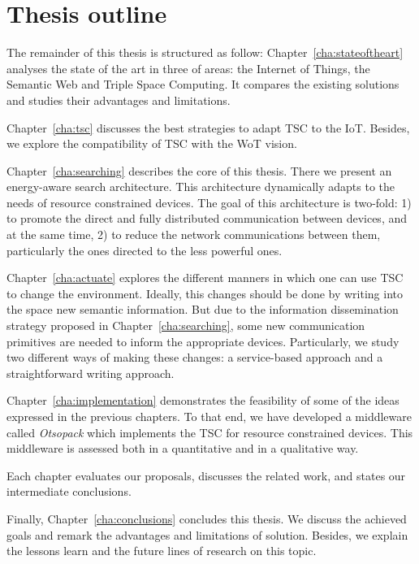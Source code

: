 \section{Thesis outline}
\label{sec:Outline}


The remainder of this thesis is structured as follow:
Chapter~\ref{cha:stateoftheart} analyses the state of the art in three of areas:
the Internet of Things, the Semantic Web and Triple Space Computing.
It compares the existing solutions and studies their advantages and limitations.

Chapter~\ref{cha:tsc} discusses the best strategies to adapt TSC to the IoT.
Besides, we explore the compatibility of TSC with the WoT vision.

Chapter~\ref{cha:searching} describes the core of this thesis.
There we present an energy-aware search architecture.
This architecture dynamically adapts to the needs of resource constrained devices.
The goal of this architecture is two-fold:
1) to promote the direct and fully distributed communication between devices,
and at the same time,
2) to reduce the network communications between them, particularly the ones directed to the less powerful ones.

Chapter~\ref{cha:actuate} explores the different manners in which one can use TSC to change the environment.
Ideally, this changes should be done by writing into the space new semantic information.
But due to the information dissemination strategy proposed in Chapter~\ref{cha:searching},
some new communication primitives are needed to inform the appropriate devices.
Particularly, we study two different ways of making these changes:
a service-based approach and a straightforward writing approach. %

Chapter~\ref{cha:implementation} demonstrates the feasibility of some of the ideas expressed in the previous chapters.
To that end, we have developed a middleware called \emph{Otsopack} which implements the TSC for resource constrained devices.
This middleware is assessed both in a quantitative and in a qualitative way. %

Each chapter evaluates our proposals, discusses the related work, and states our intermediate conclusions.

Finally, Chapter~\ref{cha:conclusions} concludes this thesis.
We discuss the achieved goals and remark the advantages and limitations of solution.
Besides, we explain the lessons learn and the future lines of research on this topic.